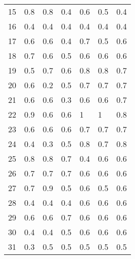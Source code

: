 \begin{table}[]
\begin{tabular}{l|lll|lll}
15              & 0.8                  & 0.8       & 0.4     & 0.6     & 0.5 & 0.4     \\
16              & 0.4                  & 0.4       & 0.4     & 0.4     & 0.4 & 0.4     \\
17              & 0.6                  & 0.6       & 0.4     & 0.7     & 0.5 & 0.6     \\
18              & 0.7                  & 0.6       & 0.5     & 0.6     & 0.6 & 0.6     \\
19              & 0.5                  & 0.7       & 0.6     & 0.8     & 0.8 & 0.7     \\
20              & 0.6                  & 0.2       & 0.5     & 0.7     & 0.7 & 0.7     \\
21              & 0.6                  & 0.6       & 0.3     & 0.6     & 0.6 & 0.7     \\
22              & 0.9                  & 0.6       & 0.6     & 1       & 1   & 0.8     \\
23              & 0.6                  & 0.6       & 0.6     & 0.7     & 0.7 & 0.7     \\
24              & 0.4                  & 0.3       & 0.5     & 0.8     & 0.7 & 0.8     \\
25              & 0.8                  & 0.8       & 0.7     & 0.4     & 0.6 & 0.6     \\
26              & 0.7                  & 0.7       & 0.7     & 0.6     & 0.6 & 0.6     \\
27              & 0.7                  & 0.9       & 0.5     & 0.6     & 0.5 & 0.6     \\
28              & 0.4                  & 0.4       & 0.4     & 0.6     & 0.6 & 0.6     \\
29              & 0.6                  & 0.6       & 0.7     & 0.6     & 0.6 & 0.6     \\
30              & 0.4                  & 0.4       & 0.5     & 0.6     & 0.6 & 0.6     \\
31              & 0.3                  & 0.5       & 0.5     & 0.5     & 0.5 & 0.5     \\
\end{tabular}
\end{table}
\clearpage
